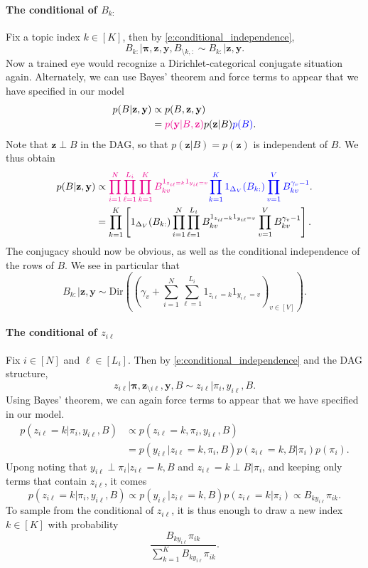 \paragraph{The conditional of $B_{k:}$}
Fix a topic index $k\in[K]$, then by \eqref{e:conditional_independence},
$$
    B_{k:} \vert \mathbf{\pi}, \mathbf{z}, \mathbf{y}, B_{\setminus k,:} \sim B_{k:} \vert \mathbf{z}, \mathbf{y}.
$$
Now a trained eye would recognize a Dirichlet-categorical conjugate situation again. 
Alternately, we can use Bayes' theorem and force terms to appear that we have specified in our model
\begin{align*}
    p(B \vert \mathbf{z}, \mathbf{y}) &\propto p(B, \mathbf{z}, \mathbf{y})\\
    & = \textcolor{magenta}{p(\mathbf{y} \vert B, \mathbf{z})} p(\mathbf{z}\vert B) \textcolor{blue}{p(B)}.
\end{align*}
Note that $\mathbf{z}\perp B$ in the DAG, so that $p(\mathbf{z}\vert B) = p(\mathbf{z})$ is independent of $B$.
We thus obtain
\begin{align*}
    p(B \vert \mathbf{z}, \mathbf{y})
    &\propto \textcolor{magenta}{\prod_{i=1}^N \prod_{\ell=1}^{L_i} \prod_{k=1}^K B_{kv}^{1_{z_{i\ell}=k}1_{y_{i\ell}=v}}} \textcolor{blue}{\prod_{k=1}^K 1_{\Delta_V}(B_{k:}) \prod_{v=1}^V B_{kv}^{\gamma_v-1}}.\\
    &= \prod_{k=1}^K\left[ 1_{\Delta_V}(B_{k:}) \prod_{i=1}^N \prod_{\ell=1}^{L_i} B_{kv}^{1_{z_{i\ell}=k}1_{y_{i\ell}=v}} \prod_{v=1}^V B_{kv}^{\gamma_v-1} \right].
\end{align*}
The conjugacy should now be obvious, as well as the conditional independence of the rows of $B$. 
We see in particular that
$$
    B_{k:} \vert \mathbf{z}, \mathbf{y} \sim \mathrm{Dir}\left( (\gamma_v + \sum_{i=1}^N \sum_{\ell=1}^{L_i} 1_{z_{i\ell}=k}1_{y_{i\ell}=v})_{v\in [V]} \right).
$$

\paragraph{The conditional of $z_{i\ell}$}
Fix $i\in[N]$ and $\ell\in[L_i]$. 
Then by \eqref{e:conditional_independence} and the DAG structure,
$$
    z_{i\ell} \vert \mathbf{\pi}, \mathbf{z}_{\setminus i\ell}, \mathbf{y}, B \sim z_{i\ell} \vert \pi_i, y_{i\ell}, B.
$$
Using Bayes' theorem, we can again force terms to appear that we have specified in our model.
\begin{align*}
    p(z_{i\ell} = k \vert \pi_i, y_{i\ell}, B) 
    &\propto p(z_{i\ell} = k, \pi_i, y_{i\ell}, B)\\
    &= p(y_{i\ell}\vert z_{i\ell} = k, \pi_i, B) p(z_{i\ell} = k, B\vert\pi_i) p(\pi_i).
\end{align*}
Upong noting that $y_{i\ell}\perp \pi_i\vert z_{i\ell} = k,  B$ and $z_{i\ell} = k \perp B\vert\pi_i$, and keeping only terms that contain $z_{i\ell}$, it comes 
$$
    p(z_{i\ell} = k \vert \pi_i, y_{i\ell}, B) \propto p(y_{i\ell}\vert z_{i\ell} = k, B) p(z_{i\ell} = k \vert\pi_i) \propto B_{k y_{i\ell}} \pi_{ik}.
$$
To sample from the conditional of $z_{i\ell}$, it is thus enough to draw a new index $k\in[K]$ with probability 
$$
    \frac{B_{k y_{i\ell}} \pi_{ik}}{\sum_{k=1}^K B_{k y_{i\ell}} \pi_{ik}}.
$$

